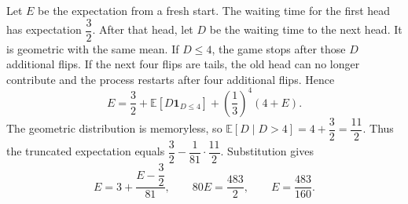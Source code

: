 Let $E$ be the expectation from a fresh start. The waiting time for the first head has expectation $\dfrac{3}{2}$. After that head, let $D$ be the waiting time to the next head. It is geometric with the same mean. If $D\le4$, the game stops after those $D$ additional flips. If the next four flips are tails, the old head can no longer contribute and the process restarts after four additional flips. Hence
\[E=\dfrac{3}{2}+\mathbb E[D\mathbf1_{D\le4}]+\left(\dfrac{1}{3}\right)^4(4+E).\]
The geometric distribution is memoryless, so $\mathbb E[D\mid D>4]=4+\dfrac{3}{2}=\dfrac{11}{2}$. Thus the truncated expectation equals $\dfrac{3}{2}-\dfrac{1}{81}\cdot\dfrac{11}{2}$. Substitution gives
\[E=3+\dfrac{E-\dfrac{3}{2}}{81},\qquad80E=\dfrac{483}{2},\qquad\boxed{E=\dfrac{483}{160}}.\]
